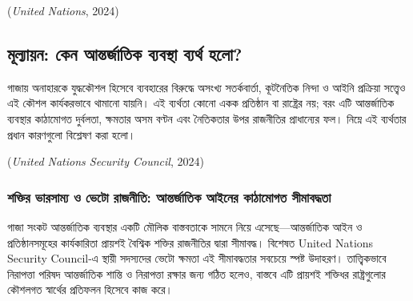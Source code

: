 (\emph{United Nations}, 2024)

\vspace{0.3em}

\subsection{মূল্যায়ন: কেন আন্তর্জাতিক ব্যবস্থা ব্যর্থ
হলো?}\label{ux9aeux9b2ux9afux9afux9a8-ux995ux9a8-ux986ux9a8ux9a4ux9b0ux99cux9a4ux995-ux9acux9afux9acux9b8ux9a5-ux9acux9afux9b0ux9a5-ux9b9ux9b2}

গাজায় অনাহারকে যুদ্ধকৌশল হিসেবে ব্যবহারের বিরুদ্ধে অসংখ্য সতর্কবার্তা, কূটনৈতিক
নিন্দা ও আইনি প্রক্রিয়া সত্ত্বেও এই কৌশল কার্যকরভাবে থামানো যায়নি। এই ব্যর্থতা
কোনো একক প্রতিষ্ঠান বা রাষ্ট্রের নয়; বরং এটি আন্তর্জাতিক ব্যবস্থার কাঠামোগত
দুর্বলতা, ক্ষমতার অসম বণ্টন এবং নৈতিকতার উপর রাজনীতির প্রাধান্যের ফল। নিম্নে এই
ব্যর্থতার প্রধান কারণগুলো বিশ্লেষণ করা হলো।

(\emph{United Nations Security Council}, 2024)

\vspace{0.3em}

\subsubsection{শক্তির ভারসাম্য ও ভেটো রাজনীতি: আন্তর্জাতিক আইনের
কাঠামোগত
সীমাবদ্ধতা}\label{ux9b6ux995ux9a4ux9b0-ux9adux9b0ux9b8ux9aeux9af-ux993-ux9adux99f-ux9b0ux99cux9a8ux9a4-ux986ux9a8ux9a4ux9b0ux99cux9a4ux995-ux986ux987ux9a8ux9b0-ux995ux9a0ux9aeux997ux9a4-ux9b8ux9aeux9acux9a6ux9a7ux9a4}

গাজা সংকট আন্তর্জাতিক ব্যবস্থার একটি মৌলিক বাস্তবতাকে সামনে নিয়ে
এসেছে---আন্তর্জাতিক আইন ও প্রতিষ্ঠানসমূহের কার্যকারিতা প্রায়শই বৈশ্বিক শক্তির
রাজনীতির দ্বারা সীমাবদ্ধ। বিশেষত United Nations Security Council-এ স্থায়ী
সদস্যদের ভেটো ক্ষমতা এই সীমাবদ্ধতার সবচেয়ে স্পষ্ট উদাহরণ। তাত্ত্বিকভাবে
নিরাপত্তা পরিষদ আন্তর্জাতিক শান্তি ও নিরাপত্তা রক্ষার জন্য গঠিত হলেও, বাস্তবে
এটি প্রায়শই শক্তিধর রাষ্ট্রগুলোর কৌশলগত স্বার্থের প্রতিফলন হিসেবে কাজ করে।

